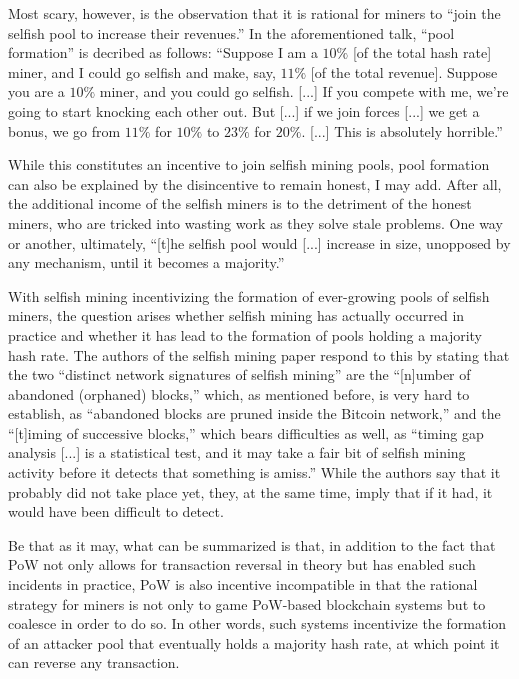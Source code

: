 Most scary, however, is the observation that it is rational for miners to  ``join the selfish pool to increase their revenues.''
In the aforementioned talk, ``pool formation'' is decribed as follows:
``Suppose I am a $10\%$ [of the total hash rate] miner, and I could go selfish and make, say, $11\%$ [of the total revenue].
Suppose you are a $10\%$ miner, and you could go selfish. [...]
If you compete with me, we're going to start knocking each other out.
But [...] if we join forces [...] we get a bonus, we go from $11\%$ for $10\%$ to $23\%$ for $20\%$. [...]
This is absolutely horrible.''

While this constitutes an incentive to join selfish mining pools, pool formation can also be explained by the disincentive to remain honest, I may add.
After all, the additional income of the selfish miners is to the detriment of the honest miners, who are tricked into wasting work as they solve stale problems.
One way or another, ultimately, ``[t]he selfish pool would [...] increase in size, unopposed by any mechanism, until it becomes a majority.''

With selfish mining incentivizing the formation of ever-growing pools of selfish miners, the question arises whether selfish mining has actually occurred in practice and whether it has lead to the formation of pools holding a majority hash rate.
The authors of the selfish mining paper respond to this \autocite{hackingd2014detectsm} by stating that the two ``distinct network signatures of selfish mining'' are the ``[n]umber of abandoned (orphaned) blocks,'' which, as mentioned before, is very hard to establish, as ``abandoned blocks are pruned inside the Bitcoin network,'' and the ``[t]iming of successive blocks,'' which bears difficulties as well, as ``timing gap analysis [...] is a statistical test, and it may take a fair bit of selfish mining activity before it detects that something is amiss.''
While the authors say that it probably did not take place yet, they, at the same time, imply that if it had, it would have been difficult to detect.

Be that as it may, what can be summarized is that, in addition to the fact that PoW not only allows for transaction reversal in theory but has enabled such incidents in practice, PoW is also incentive incompatible in that the rational strategy for miners is not only to game PoW-based blockchain systems but to coalesce in order to do so.
In other words, such systems incentivize the formation of an attacker pool that eventually holds a majority hash rate, at which point it can reverse any transaction.

